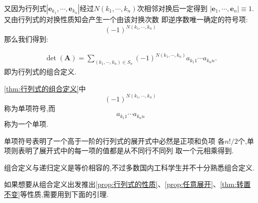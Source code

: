又因为行列式$\left|\bm{e}_{k_1}
,\cdots,\bm{e}_{k_n}
\right|$经过$N\left(k_1,\cdots,k_n\right)$次相邻对换后一定得到
$\left|\bm{e}_1,\cdots,\bm{e}_n
\right|\equiv 1.$又由行列式的对换性质知会产生一个由该対换次数
即逆序数唯一确定的符号项:
\[
\left(- 1\right)^{N\left(k_1,\cdots,k_n\right)}
\]那么我们得到:
\begin{formal}
\begin{theorem}[行列式的组合定义]\label{thm:行列式的组合定义}
\begin{align*}
     \det\left(\bm{A}\right) = \sum_{\left(
        k_1,\cdots,k_n
    \right) \in S_n}\left(-1\right)^{N\left(
        k_1,\cdots,k_n
    \right)} a_{k_{1}1} \cdots a_{k_{n}n}.
\end{align*}
即为行列式的组合定义.
\end{theorem}
\end{formal}
\begin{formal}
\begin{definition}[单项与单项符号]\label{def:单项与单项符号}\cref{thm:行列式的组合定义}中
    \[
\left(-1\right)^{N\left(k_1,\cdots,k_n\right)}
\]称为单项符号,而\[
a_{k_{1}1} \cdots a_{k_{n}n}
\]称为一个单项.
\end{definition}
\end{formal}
\begin{red}
    \begin{remark}
单项符号表明了一个高于一阶的行列式的展开式中必然是正项和负项
各$n!/2$个,单项则表明了展开式中的每一项的值都是从不同行不同列
取一个元相乘得到.
    \end{remark}
\end{red}
\begin{red}
\begin{remark}
    组合定义与递归定义是等价相容的,不过多数国内工科学生并不十分熟悉组合定义.
\end{remark}
\end{red}
\begin{red}
    \begin{remark}
        如果想要从组合定义出发推出\cref{prop:行列式的性质}、\cref{prop:任意展开}、\cref{thm:转置不变}等性质,需要用到下面的引理.
    \end{remark}
\end{red}
